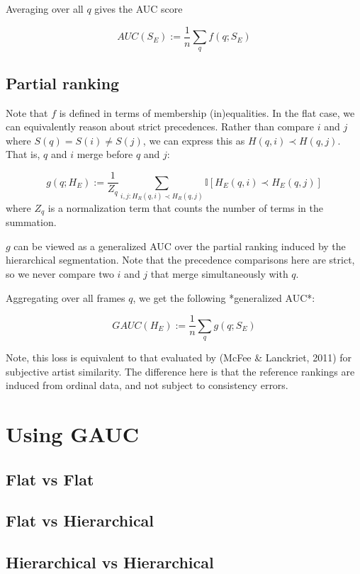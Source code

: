 \documentclass{article}
\begin{document}
Averaging over all $q$ gives the AUC score

$$
AUC(S_E) := \frac{1}{n} \sum_q f(q ; S_E)
$$

\subsection{Partial ranking}

Note that $f$ is defined in terms of membership (in)equalities.
In the flat case, we can equivalently reason about strict precedences.
Rather than compare $i$ and $j$ where $S(q) = S(i) \neq S(j)$, we can express this as $H(q, i) \prec H(q, j)$.
That is, $q$ and $i$ merge before $q$ and $j$:

$$
g(q ; H_E) := \frac{1}{Z_q} \sum_{i,j : H_R(q, i) \prec H_R(q, j)}  \mathbb{I}\left[ H_E(q, i) \prec H_E(q, j) \right]
$$
where $Z_q$ is a normalization term that counts the number of terms in the summation.

$g$ can be viewed as a generalized AUC over the partial ranking induced by the hierarchical segmentation.
Note that the precedence comparisons here are strict, so we never compare two $i$ and $j$ that merge simultaneously with $q$.

Aggregating over all frames $q$, we get the following *generalized AUC*:

$$
GAUC(H_E) := \frac{1}{n} \sum_q g(q ; S_E)
$$

Note, this loss is equivalent to that evaluated by (McFee \& Lanckriet, 2011) for subjective artist similarity.
The difference here is that the reference rankings are induced from ordinal data, and not subject to consistency errors.

\section{Using GAUC}\label{sec:using_method}

\subsection{Flat vs Flat}

\subsection{Flat vs Hierarchical}

\subsection{Hierarchical vs Hierarchical}
\end{document}
